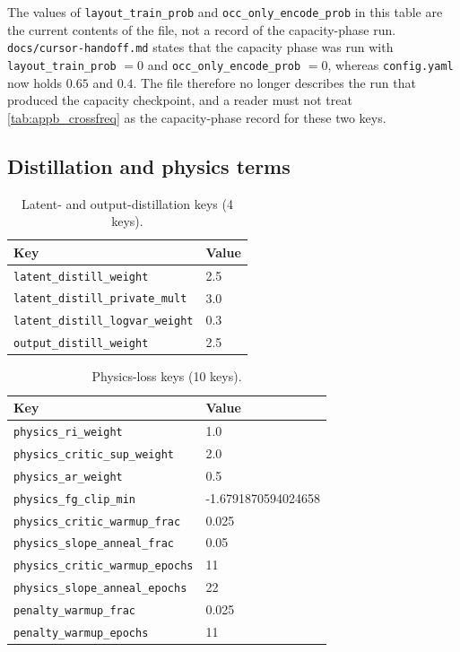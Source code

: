 The values of \texttt{layout\_train\_prob} and \texttt{occ\_only\_encode\_prob} in this
table are the current contents of the file, not a record of the capacity-phase run.
\texttt{docs/cursor-handoff.md} states that the capacity phase was run with
\texttt{layout\_train\_prob} $=0$ and \texttt{occ\_only\_encode\_prob} $=0$, whereas
\texttt{config.yaml} now holds $0.65$ and $0.4$. The file therefore no longer describes
the run that produced the capacity checkpoint, and a reader must not treat
\autoref{tab:appb_crossfreq} as the capacity-phase record for these two keys.

\subsection{Distillation and physics terms}
\label{subsec:appb_distill_physics}

\begin{table}[htbp]
\centering
\caption{Latent- and output-distillation keys (4 keys).}
\label{tab:appb_distill}
\begin{tabular}{@{}ll@{}}
\hline
Key & Value \\
\hline
\texttt{latent\_distill\_weight} & 2.5 \\
\texttt{latent\_distill\_private\_mult} & 3.0 \\
\texttt{latent\_distill\_logvar\_weight} & 0.3 \\
\texttt{output\_distill\_weight} & 2.5 \\
\hline
\end{tabular}
\end{table}

\begin{table}[htbp]
\centering
\caption{Physics-loss keys (10 keys).}
\label{tab:appb_physics}
\begin{tabular}{@{}ll@{}}
\hline
Key & Value \\
\hline
\texttt{physics\_ri\_weight} & 1.0 \\
\texttt{physics\_critic\_sup\_weight} & 2.0 \\
\texttt{physics\_ar\_weight} & 0.5 \\
\texttt{physics\_fg\_clip\_min} & -1.6791870594024658 \\
\texttt{physics\_critic\_warmup\_frac} & 0.025 \\
\texttt{physics\_slope\_anneal\_frac} & 0.05 \\
\texttt{physics\_critic\_warmup\_epochs} & 11 \\
\texttt{physics\_slope\_anneal\_epochs} & 22 \\
\texttt{penalty\_warmup\_frac} & 0.025 \\
\texttt{penalty\_warmup\_epochs} & 11 \\
\hline
\end{tabular}
\end{table}

